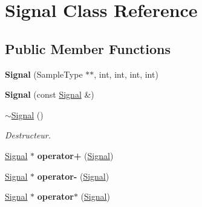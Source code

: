 \hypertarget{class_signal}{\section{Signal Class Reference}
\label{class_signal}
}
\subsection*{Public Member Functions}
\begin{DoxyCompactItemize}
\item 
\hypertarget{class_signal_a7d7ef373c7af5cfbdb950bf2d20befa2}{{\bfseries Signal} (Sample\-Type $\ast$$\ast$, int, int, int, int)}\label{class_signal_a7d7ef373c7af5cfbdb950bf2d20befa2}

\item 
\hypertarget{class_signal_a05383557d64e49fe332fba8c9ba00ee1}{{\bfseries Signal} (const \hyperlink{class_signal}{Signal} \&)}\label{class_signal_a05383557d64e49fe332fba8c9ba00ee1}

\item 
\hypertarget{class_signal_ae7a1d116cda63e790bf9aab549d57d3a}{\hyperlink{class_signal_ae7a1d116cda63e790bf9aab549d57d3a}{$\sim$\-Signal} ()}\label{class_signal_ae7a1d116cda63e790bf9aab549d57d3a}

\begin{DoxyCompactList}\small\item\em Destructeur. \end{DoxyCompactList}\item 
\hypertarget{class_signal_ae2e2646b2fa7e8c1e7ea7061e67590ef}{\hyperlink{class_signal}{Signal} $\ast$ {\bfseries operator+} (\hyperlink{class_signal}{Signal})}\label{class_signal_ae2e2646b2fa7e8c1e7ea7061e67590ef}

\item 
\hypertarget{class_signal_a843324818f2dccfe55785f2b5e50d1aa}{\hyperlink{class_signal}{Signal} $\ast$ {\bfseries operator-\/} (\hyperlink{class_signal}{Signal})}\label{class_signal_a843324818f2dccfe55785f2b5e50d1aa}

\item 
\hypertarget{class_signal_a38b54facba43de6e3be75dbbd6809764}{\hyperlink{class_signal}{Signal} $\ast$ {\bfseries operator$\ast$} (\hyperlink{class_signal}{Signal})}\label{class_signal_a38b54facba43de6e3be75dbbd6809764}


\end{DoxyCompactItemize}

